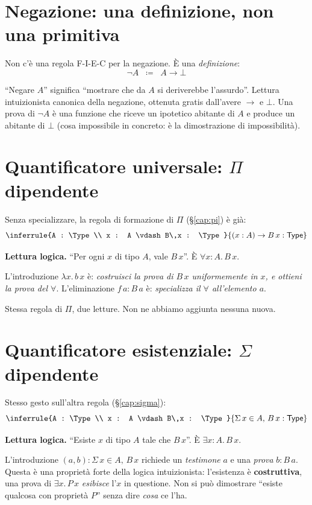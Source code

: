 \section*{Negazione: una definizione, non una primitiva}

Non c'\`e una regola F-I-E-C per la negazione. \`E una \emph{definizione}:
\[
\neg A \;\;\coloneqq\;\; A \to \bot
\]

\noindent ``Negare $A$'' significa ``mostrare che da $A$ si deriverebbe l'assurdo''. Lettura intuizionista canonica della negazione, ottenuta gratis dall'avere $\to$ e $\bot$. Una prova di $\neg A$ \`e una funzione che riceve un ipotetico abitante di $A$ e produce un abitante di $\bot$ (cosa impossibile in concreto: \`e la dimostrazione di impossibilit\`a).

\section*{Quantificatore universale: $\Pi$ dipendente}

Senza specializzare, la regola di formazione di $\Pi$ (\S\ref{cap:pi}) \`e gi\`a:
\[
\inferrule{A : \Type \\ x : A \vdash B\,x : \Type}{(x : A) \to B\,x : \Type}
\]

\noindent\textbf{Lettura logica.} ``Per ogni $x$ di tipo $A$, vale $B\,x$''. \`E $\forall x : A.\,B\,x$.

L'introduzione $\lambda x.\,b\,x$ \`e: \emph{costruisci la prova di $B\,x$ uniformemente in $x$, e ottieni la prova del $\forall$}. L'eliminazione $f\,a : B\,a$ \`e: \emph{specializza il $\forall$ all'elemento $a$}.

\noindent Stessa regola di $\Pi$, due letture. Non ne abbiamo aggiunta nessuna nuova.

\section*{Quantificatore esistenziale: $\Sigma$ dipendente}

Stesso gesto sull'altra regola (\S\ref{cap:sigma}):
\[
\inferrule{A : \Type \\ x : A \vdash B\,x : \Type}{\Sigma\,x \in A,\,B\,x : \Type}
\]

\noindent\textbf{Lettura logica.} ``Esiste $x$ di tipo $A$ tale che $B\,x$''. \`E $\exists x : A.\,B\,x$.

L'introduzione $(a, b) : \Sigma\,x \in A,\,B\,x$ richiede un \emph{testimone} $a$ e una \emph{prova} $b : B\,a$. Questa \`e una propriet\`a forte della logica intuizionista: l'esistenza \`e \textbf{costruttiva}, una prova di $\exists x.\,P\,x$ \emph{esibisce} l'$x$ in questione. Non si pu\`o dimostrare ``esiste qualcosa con propriet\`a $P$'' senza dire \emph{cosa} ce l'ha.

